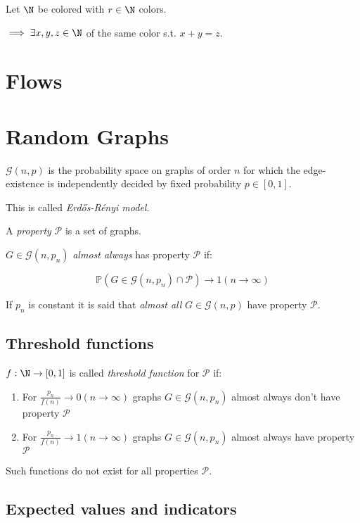 Let $\N$ be colored with $r \in \N$ colors.

$\implies \exists x, y, z \in \N$ of the same color s.t. $x+y=z$.

\section*{Flows}

\section*{Random Graphs}

$\mathcal{G}(n,p)$ is the probability space on graphs of order $n$ for which the edge-existence is independently decided by fixed probability $p \in [0,1]$.

This is called \emph{Erd\H{o}s-R\'{e}nyi model}.

\spacing

A \emph{property} $\mathcal{P}$ is a set of graphs.

$G \in \mathcal{G}(n,p_n)$ \emph{almost always} has property $\mathcal{P}$ if:

$$\mathbb{P}(G \in \mathcal{G}(n,p_n) \cap \mathcal{P}) \to 1 (n \to \infty)$$

If $p_n$ is constant it is said that \emph{almost all} $G \in \mathcal{G}(n,p)$ have property $\mathcal{P}$.

\subsection*{Threshold functions}

$f : \N \to [0,1]$ is called \emph{threshold function} for $\mathcal{P}$ if:

\begin{enumerate}
	\item For $\frac{p_n}{f(n)} \to 0 (n \to \infty)$ graphs $G \in \mathcal{G}(n,p_n)$ almost always don't have property $\mathcal{P}$
	\item For $\frac{p_n}{f(n)} \to 1 (n \to \infty)$ graphs $G \in \mathcal{G}(n,p_n)$ almost always have property $\mathcal{P}$
\end{enumerate}

Such functions do not exist for all properties $\mathcal{P}$.

\subsection*{Expected values and indicators}

